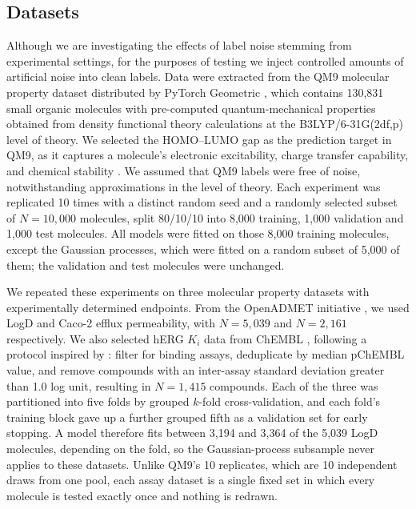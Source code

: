 \subsection{Datasets}

Although we are investigating the effects of label noise stemming from experimental settings, for the purposes of testing we inject controlled amounts of artificial noise into clean labels. Data were extracted from the QM9 molecular property dataset distributed by PyTorch Geometric \citep{Ramakrishnan2014}, which contains 130,831 small organic molecules with pre-computed quantum-mechanical properties obtained from density functional theory calculations at the B3LYP/6-31G(2df,p) level of theory. We selected the HOMO--LUMO gap as the prediction target in QM9, as it captures a molecule's electronic excitability, charge transfer capability, and chemical stability \citep{Fediai2023}. We assumed that QM9 labels were free of noise, notwithstanding approximations in the level of theory. Each experiment was replicated 10 times with a distinct random seed and a randomly selected subset of $N = 10{,}000$ molecules, split 80/10/10 into 8,000 training, 1,000 validation and 1,000 test molecules. All models were fitted on those 8,000 training molecules, except the Gaussian processes, which were fitted on a random subset of 5,000 of them; the validation and test molecules were unchanged.

We repeated these experiments on three molecular property datasets with experimentally determined endpoints. From the OpenADMET initiative \citep{openadmet}, we used LogD and Caco-2 efflux permeability, with $N = 5{,}039$ and $N = 2{,}161$ respectively. We also selected hERG $K_i$ data from ChEMBL \citep{Zdrazil2023}, following a protocol inspired by \citet{landrum2024}: filter for binding assays, deduplicate by median pChEMBL value, and remove compounds with an inter-assay standard deviation greater than 1.0 log unit, resulting in $N = 1{,}415$ compounds. Each of the three was partitioned into five folds by grouped $k$-fold cross-validation, and each fold's training block gave up a further grouped fifth as a validation set for early stopping. A model therefore fits between 3,194 and 3,364 of the 5,039 LogD molecules, depending on the fold, so the Gaussian-process subsample never applies to these datasets. Unlike QM9's 10 replicates, which are 10 independent draws from one pool, each assay dataset is a single fixed set in which every molecule is tested exactly once and nothing is redrawn.

